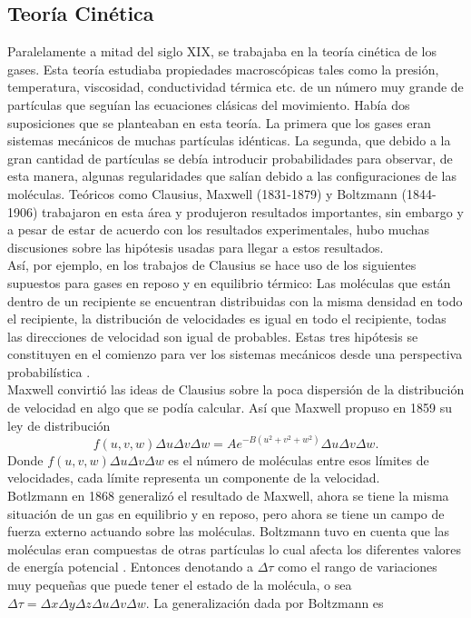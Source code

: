 \subsection{Teoría Cinética}
Paralelamente a mitad del siglo XIX, se trabajaba en la teoría cinética de los gases. Esta teoría estudiaba propiedades macroscópicas tales como la presión, temperatura, viscosidad, conductividad térmica etc. de un número muy grande de partículas que seguían las ecuaciones clásicas del movimiento. Había dos suposiciones que se planteaban en esta teoría. La primera que los gases eran sistemas mecánicos de muchas partículas idénticas. La segunda, que debido a la gran cantidad de partículas se debía introducir probabilidades para observar, de esta manera, algunas regularidades que salían debido a las configuraciones de las moléculas. Teóricos como Clausius, Maxwell (1831-1879) y Boltzmann (1844-1906) trabajaron en esta área y produjeron resultados importantes, sin	 embargo y a pesar de estar de acuerdo con los resultados experimentales, hubo muchas discusiones sobre las hipótesis usadas para llegar a estos resultados.
\\
Así, por ejemplo, en los trabajos de Clausius se hace uso de los siguientes supuestos para gases en reposo y en equilibrio térmico: Las moléculas que están dentro de un recipiente se encuentran distribuidas con la misma densidad en todo el recipiente, la distribución de velocidades es igual en todo el recipiente, todas las direcciones de velocidad son igual de probables. Estas tres hipótesis se constituyen en el comienzo para ver los sistemas mecánicos desde una perspectiva probabilística \cite{Ehrenfest}.
\\
Maxwell convirtió las ideas de Clausius sobre la poca dispersión de la distribución de velocidad en algo que se podía calcular. Así que Maxwell propuso en 1859 su ley de distribución
\begin{equation}
f(u,v,w) \Delta u \Delta v \Delta w = A e^{-B(u^{2}+v^{2}+w^{2})}  \Delta u \Delta v \Delta w.
\end{equation}
Donde $f(u,v,w) \Delta u \Delta v \Delta w $ es el número de moléculas entre esos límites de velocidades, cada límite representa un componente de la velocidad.
\\
Botlzmann en 1868 generalizó el resultado de Maxwell, ahora se tiene la misma situación de un gas en equilibrio y en reposo, pero ahora se tiene un campo de fuerza externo actuando sobre las moléculas. Boltzmann tuvo en cuenta que las moléculas eran compuestas de otras partículas  lo cual afecta los diferentes valores de energía potencial  \cite{Ehrenfest}. Entonces denotando a $\Delta \tau$ como el rango de variaciones muy pequeñas que puede tener el estado de la molécula, o sea $\Delta \tau= \Delta x \Delta y \Delta z \Delta u \Delta v \Delta w$. La generalización dada por Boltzmann es
